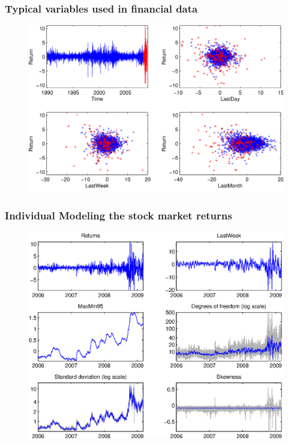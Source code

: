 \documentclass{beamer}
\begin{document}
\begin{frame}
  \frametitle{Typical variables used in financial data}
  \begin{figure}
    \centering
    \includegraphics[height=0.8\textheight]{SP500}
  \end{figure}
\end{frame}


 \begin{frame}
  \frametitle{Individual Modeling the stock market returns}
    \begin{figure}
      \centering
      \includegraphics[height=0.9\textheight]{MomentPlotSP500}
    \end{figure}
\end{frame}
\end{document}
